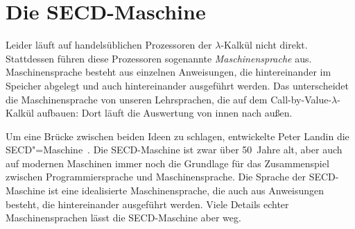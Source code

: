 \section{Die SECD-Maschine}

Leider läuft auf handelsüblichen Prozessoren der $\lambda$-Kalkül
nicht direkt.  Stattdessen führen diese Prozessoren
sogenannte \textit{Maschinensprache} aus.  
Maschinensprache besteht aus einzelnen Anweisungen, die hintereinander
im Speicher abgelegt und auch hintereinander ausgeführt werden.  Das
unterscheidet die Maschinensprache von unseren Lehrsprachen, die auf
dem Call-by-Value-$\lambda$-Kalkül
aufbauen: Dort läuft die Auswertung von innen nach außen.

Um eine Brücke zwischen beiden Ideen zu schlagen, entwickelte Peter Landin
die SECD"=Maschine~\cite{Landin1964}.  Die SECD-Maschine ist zwar über
50~Jahre alt, aber auch auf modernen Maschinen immer noch die
Grundlage für das Zusammenspiel zwischen Programmiersprache und
Maschinensprache.  Die Sprache der SECD-Maschine ist eine idealisierte
Maschinensprache, die auch aus Anweisungen besteht, die
hintereinander ausgeführt werden.  Viele Details echter
Maschinensprachen lässt die SECD-Maschine aber weg.

